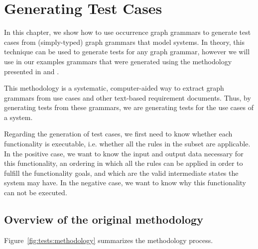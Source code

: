 \chapter{Generating Test Cases}\label{ch:tests}

In this chapter, we show how to use occurrence graph grammars to generate test cases from (simply-typed) graph grammars that model systems. In theory, this technique can be used to generate tests for any graph grammar, however we will use in our examples grammars that were generated using the methodology presented in \cite{Junior2015} and \cite{BezerraWEIT2016}.

This methodology is a systematic, computer-aided way to extract graph grammars from use cases and other text-based requirement documents. Thus, by generating tests from these grammars, we are generating tests for the use cases of a system.

Regarding the generation of test cases, we first need to know whether each functionality is executable, i.e. whether all the rules in the subset are applicable. In the positive case, we want to know the input and output data necessary for this functionality, an ordering in which all the rules can be applied in order to fulfill the functionality goals, and which are the valid intermediate states the system may have. In the negative case, we want to know why this functionality can not be executed.

\section{Overview of the original methodology}

Figure~\ref{fig:tests:methodology} summarizes the methodology process.

